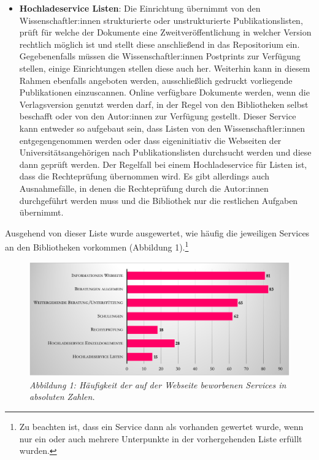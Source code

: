 \documentclass[a4paper,
fontsize=11pt,
oneside,
numbers=noperiodatend,
parskip=half-,
bibliography=totoc,
final
]{scrartcl}
\begin{document}
\begin{itemize}
{    Vorgang wurde als nicht beworbener Service gewertet, da es hierzu in
    der Regel keine Informationen auf den Webseiten gibt. Er kann über
    Anbindung an DeepGreen erfolgen.} Anzumerken ist, dass das
  eigenständige Hochladen an manchen Bibliotheken nicht vorgesehen ist.
\item
  \textbf{Hochladeservice Listen}: Die Einrichtung übernimmt von den
  Wissenschaftler:innen strukturierte oder unstrukturierte
  Publikationslisten, prüft für welche der Dokumente eine
  Zweitveröffentlichung in welcher Version rechtlich möglich ist und
  stellt diese anschließend in das Repositorium ein. Gegebenenfalls
  müssen die Wissenschaftler:innen Postprints zur Verfügung stellen,
  einige Einrichtungen stellen diese auch her. Weiterhin kann in diesem
  Rahmen ebenfalls angeboten werden, ausschließlich gedruckt vorliegende
  Publikationen einzuscannen. Online verfügbare Dokumente werden, wenn
  die Verlagsversion genutzt werden darf, in der Regel von den
  Bibliotheken selbst beschafft oder von den Autor:innen zur Verfügung
  gestellt. Dieser Service kann entweder so aufgebaut sein, dass Listen
  von den Wissenschaftler:innen entgegengenommen werden oder dass
  eigeninitiativ die Webseiten der Universitätsangehörigen nach
  Publikationslisten durchsucht werden und diese dann geprüft werden.
  Der Regelfall bei einem Hochladeservice für Listen ist, dass die
  Rechteprüfung übernommen wird. Es gibt allerdings auch Ausnahmefälle,
  in denen die Rechteprüfung durch die Autor:innen durchgeführt werden
  muss und die Bibliothek nur die restlichen Aufgaben übernimmt.
\end{itemize}

Ausgehend von dieser Liste wurde ausgewertet, wie häufig die jeweiligen
Services an den Bibliotheken vorkommen (Abbildung 1).\footnote{Zu
  beachten ist, dass ein Service dann als vorhanden gewertet wurde, wenn
  nur ein oder auch mehrere Unterpunkte in der vorhergehenden Liste
  erfüllt wurden.}

\begin{figure}[h!]
\centering
\includegraphics[width=.9\textwidth]{img/abb1.png}
\caption{\textit{Abbildung 1: Häufigkeit der auf der Webseite beworbenen
Services in absoluten Zahlen.}}
\end{figure}
\end{document}
